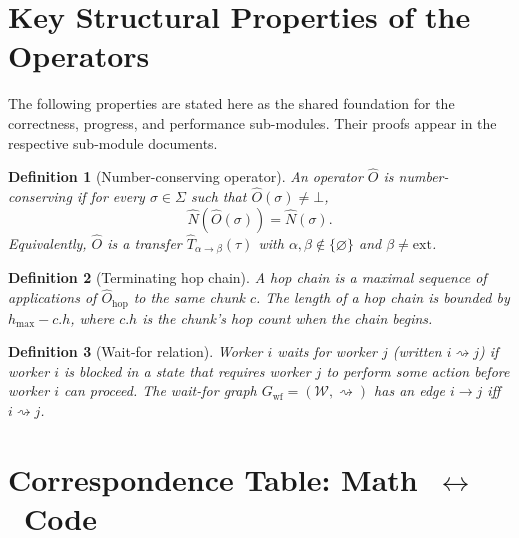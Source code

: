 \documentclass[11pt,a4paper]{article}
\newtheorem{definition}{Definition}[section]
\newcommand{\Num}{\hat{N}}
\newcommand{\Trf}[2]{\hat{T}_{#1 \to #2}}
\begin{document}
\section{Key Structural Properties of the Operators}

The following properties are stated here as the shared foundation
for the correctness, progress, and performance sub-modules.  Their
proofs appear in the respective sub-module documents.

\begin{definition}[Number-conserving operator]
\label{def:conserving}
An operator $\hat{O}$ is \emph{number-conserving} if for every
$\sigma \in \Sigma$ such that $\hat{O}(\sigma) \neq \bot$,
\[
  \Num(\hat{O}(\sigma)) = \Num(\sigma).
\]
Equivalently, $\hat{O}$ is a transfer $\Trf{\alpha}{\beta}(\tau)$ with
$\alpha, \beta \notin \{\varnothing\}$ and $\beta \neq \text{ext}$.
\end{definition}

\begin{definition}[Terminating hop chain]
\label{def:hop-chain}
A \emph{hop chain} is a maximal sequence of applications of
$\hat{O}_{\text{hop}}$ to the same chunk $c$.  The length of a hop
chain is bounded by $h_{\max} - c.h$, where $c.h$ is the chunk's
hop count when the chain begins.
\end{definition}

\begin{definition}[Wait-for relation]
\label{def:waitfor}
Worker $i$ \emph{waits for} worker $j$ (written $i \rightsquigarrow j$)
if worker $i$ is blocked in a state that requires worker $j$ to
perform some action before worker $i$ can proceed.  The
\emph{wait-for graph} $G_{\text{wf}} = (\mathcal{W}, \rightsquigarrow)$
has an edge $i \to j$ iff $i \rightsquigarrow j$.
\end{definition}

\section{Correspondence Table: Math~$\leftrightarrow$~Code}
\label{sec:corr}
\end{document}
